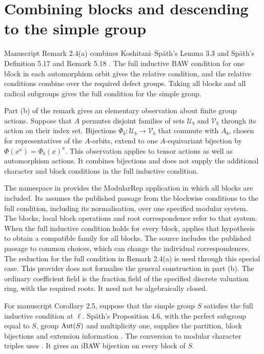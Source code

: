 \section{Combining blocks and descending to the simple group}

Manuscript Remark 2.4(a) combines Koshitani--Sp\"ath's Lemma 3.3
\cite{KoshitaniSpath2016} and Sp\"ath's Definition 5.17 and Remark 5.18
\cite{Spath2013}. The full
inductive BAW condition for one block in each automorphism orbit
gives the relative condition, and the relative conditions combine
over the required defect groups.
Taking all blocks and all radical subgroups gives the full
condition for the simple group.

Part (b) of the remark gives an elementary observation about finite
group actions. Suppose that $A$ permutes disjoint families of sets
$\mathcal U_b$ and $\mathcal V_b$ through its action on their index set.
Bijections $\Phi_b:\mathcal U_b\to\mathcal V_b$ that commute with $A_b$,
chosen for representatives of the $A$-orbits, extend to one
$A$-equivariant bijection by $\Phi(x^a)=\Phi_b(x)^a$.
This observation applies to tensor actions as well as automorphism
actions. It combines bijections and does not supply the additional
character and block conditions in the full inductive condition.

\begin{implementation}
The  namespace in
 provides the ModularRep application
in which all blocks are included. Its  assumes the
published passage from the blockwise conditions to the full
condition, including its normalisation, over one specified
modular system. The blocks, local block
operations and root correspondence refer to that system.
When the full inductive condition holds for every block,
 applies that hypothesis to obtain a compatible
family for all blocks. The source includes the
published passage to common choices, which can change the
individual correspondences. The reduction for the full condition in
Remark 2.4(a) is used through this special case. This provider does not
formalise the general construction in part (b). The ordinary coefficient
field is the fraction field of the specified
discrete valuation ring, with the required roots. It need not be
algebraically closed.
\end{implementation}

For manuscript Corollary 2.5, suppose that the simple group $S$
satisfies the full inductive condition at $\ell$. Sp\"ath's
Proposition 4.6, with the perfect subgroup equal to $S$, group $\operatorname{Aut}(S)$ and multiplicity one, supplies the partition,
block bijections and extension information
\cite[Proposition~4.6(a)--(c)]{Spath2013}.
The conversion to modular character triples uses
\cite[Proposition~3.6(b) and Theorem~3.5(b)]{Spath2017Triples}.
It gives an iBAW bijection on every block of $S$.

